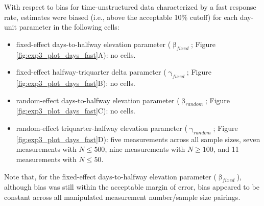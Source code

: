 \documentclass[
12pt, %
twoside,
english]{guelphthesis}
\begin{document}
With respect to bias for time-unstructured data characterized by a fast response rate, estimates were biased (i.e., above the acceptable 10\% cutoff) for each day-unit parameter in the following cells:
\begin{itemize}
\tightlist
\item
  fixed-effect days-to-halfway elevation parameter (\(\upbeta_{fixed}\); Figure \ref{fig:exp3_plot_days_fast}A): no cells.
\item
  fixed-effect halfway-triquarter delta parameter (\(\upgamma_{fixed}\); Figure \ref{fig:exp3_plot_days_fast}B): no cells.
\item
  random-effect days-to-halfway elevation parameter (\(\upbeta_{random}\); Figure \ref{fig:exp3_plot_days_fast}C): no cells.
\item
  random-effect triquarter-halfway elevation parameter (\(\upgamma_{random}\); Figure \ref{fig:exp3_plot_days_fast}D): five measurements across all sample sizes, seven measurements with \(N \le 500\), nine measurements with \(N \ge 100\), and 11 measurements with \(N \le 50\).
\end{itemize}
\noindent Note that, for the fixed-effect days-to-halfway elevation parameter (\(\upbeta_{fixed}\)), although bias was still within the acceptable margin of error, bias appeared to be constant across all manipulated measurement number/sample size pairings.
\end{document}
